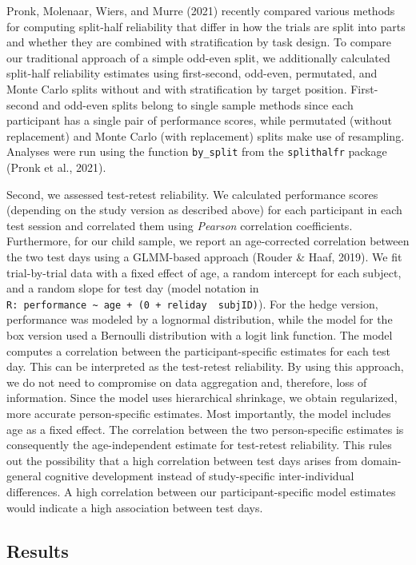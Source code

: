 \documentclass[
  man,floatsintext]{apa7}
\begin{document}
Pronk, Molenaar, Wiers, and Murre (2021) recently compared various methods for computing split-half reliability that differ in how the trials are split into parts and whether they are combined with stratification by task design.
To compare our traditional approach of a simple odd-even split, we additionally calculated split-half reliability estimates using first-second, odd-even, permutated, and Monte Carlo splits without and with stratification by target position.
First-second and odd-even splits belong to single sample methods since each participant has a single pair of performance scores, while permutated (without replacement) and Monte Carlo (with replacement) splits make use of resampling.
Analyses were run using the function \texttt{by\_split} from the \texttt{splithalfr} package (Pronk et al., 2021).

Second, we assessed test-retest reliability.
We calculated performance scores (depending on the study version as described above) for each participant in each test session and correlated them using \emph{Pearson} correlation coefficients.
Furthermore, for our child sample, we report an age-corrected correlation between the two test days using a GLMM-based approach (Rouder \& Haaf, 2019).
We fit trial-by-trial data with a fixed effect of age, a random intercept for each subject, and a random slope for test day (model notation in \texttt{R:\ performance\ \textasciitilde{}\ age\ +\ (0\ +\ reliday\ \textbar{}\ subjID)}).
For the hedge version, performance was modeled by a lognormal distribution, while the model for the box version used a Bernoulli distribution with a logit link function.
The model computes a correlation between the participant-specific estimates for each test day.
This can be interpreted as the test-retest reliability.
By using this approach, we do not need to compromise on data aggregation and, therefore, loss of information.
Since the model uses hierarchical shrinkage, we obtain regularized, more accurate person-specific estimates.
Most importantly, the model includes age as a fixed effect.
The correlation between the two person-specific estimates is consequently the age-independent estimate for test-retest reliability.
This rules out the possibility that a high correlation between test days arises from domain-general cognitive development instead of study-specific inter-individual differences.
A high correlation between our participant-specific model estimates would indicate a high association between test days.

\hypertarget{results-1}{%
\subsection{Results}\label{results-1}}
\end{document}
